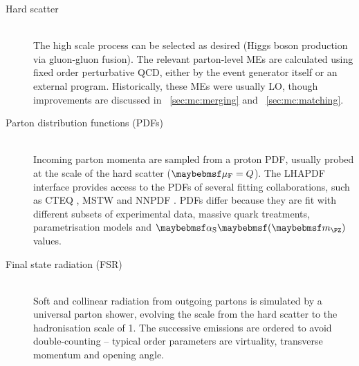 \begin{description}
\item[Hard scatter] \hfill \\
	The high scale process can be selected as desired (\eg Higgs boson production via 
	gluon-gluon fusion). The relevant parton-level \acp{ME} are calculated using fixed 
	order perturbative QCD, either by the event generator itself or an external program. 
	Historically, these \acp{ME} were usually \ac{LO}, though improvements are discussed 
	in \Section~\ref{sec:mc:merging} and \Section~\ref{sec:mc:matching}.
\item[Parton distribution functions (PDFs)] \hfill \\
	Incoming parton momenta are sampled from a proton \ac{PDF}, usually probed at the 
	scale of the hard scatter ($\muf = Q$). The LHAPDF interface \cite{LHAPDF} provides 
	access to the \acp{PDF} of several fitting collaborations, such as CTEQ \cite{CTEQ}, 
	MSTW \cite{MSTW} and NNPDF \cite{NNPDF}. \acp{PDF} differ because they are fit with 
	different subsets of experimental data, massive quark treatments, parametrisation 
	models and $\alphaS \parenths{\mZ}$ values.
\item[Final state radiation (FSR)] \hfill \\
	Soft and collinear radiation from outgoing partons is simulated by a universal parton 
	shower, evolving the scale from the hard scatter to the hadronisation scale of 
	\about\unit{1}{\GeV}. The successive emissions are ordered to avoid double-counting --
	typical order parameters are virtuality, transverse momentum and opening angle.


\end{description}
